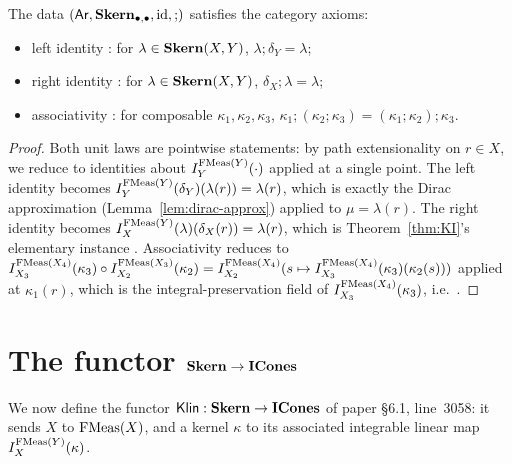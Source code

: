 \begin{proposition}\label{prop:skern-cat}%
\rocqok\mathcompok
{}
The data $(\mathsf{Ar}, \mathbf{Skern}_{\bullet,\bullet}, \mathrm{id}, \mathbin{;})$
satisfies the category axioms:
\begin{itemize}
  \item left identity
    : for $\lambda \in
    \mathbf{Skern}(X, Y)$, $\lambda \mathbin{;} \delta_Y = \lambda$;
  \item right identity
    : for $\lambda \in
    \mathbf{Skern}(X, Y)$, $\delta_X \mathbin{;} \lambda = \lambda$;
  \item associativity
    : for composable
    $\kappa_1, \kappa_2, \kappa_3$,
    $\kappa_1 \mathbin{;} (\kappa_2 \mathbin{;} \kappa_3) =
     (\kappa_1 \mathbin{;} \kappa_2) \mathbin{;} \kappa_3$.
\end{itemize}
\end{proposition}
\begin{proof}
Both unit laws are pointwise statements: by path extensionality on
$r \in X$, we reduce to identities about $I^{\mathrm{FMeas}(Y)}_Y(\cdot)$
applied at a single point. The left identity becomes
$I^{\mathrm{FMeas}(Y)}_Y(\delta_Y)(\lambda(r)) = \lambda(r)$, which is
exactly the Dirac approximation (Lemma~\ref{lem:dirac-approx})
applied to $\mu = \lambda(r)$. The right identity becomes
$I^{\mathrm{FMeas}(Y)}_X(\lambda)(\delta_X(r)) = \lambda(r)$, which is
Theorem~\ref{thm:KI}'s elementary instance
.
Associativity reduces to
$I^{\mathrm{FMeas}(X_4)}_{X_3}(\kappa_3) \circ I^{\mathrm{FMeas}(X_3)}_{X_2}(\kappa_2)
= I^{\mathrm{FMeas}(X_4)}_{X_2}(s \mapsto I^{\mathrm{FMeas}(X_4)}_{X_3}(\kappa_3)
(\kappa_2(s)))$ applied at $\kappa_1(r)$, which is the
integral-preservation field of $I^{\mathrm{FMeas}(X_4)}_{X_3}(\kappa_3)$,
i.e.\ .
\end{proof}

\section{The functor \texorpdfstring{$\mathbf{Skern} \to \mathbf{ICones}$}{Skern to ICones}}\label{sec:skern-to-icones}

We now define the functor $\mathsf{Klin} : \mathbf{Skern} \to \mathbf{ICones}$ of paper
\S6.1, line~3058: it sends $X$ to $\mathrm{FMeas}(X)$, and a kernel $\kappa$
to its associated integrable linear map $I^{\mathrm{FMeas}(Y)}_X(\kappa)$.


